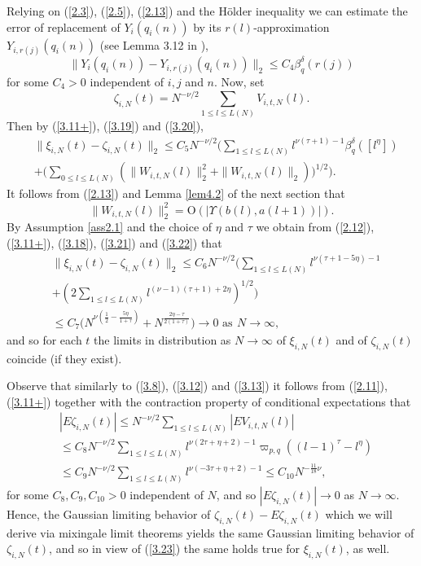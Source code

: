 Relying on (\ref{2.3}), (\ref{2.5}), (\ref{2.13}) and the H\" older inequality
 we can estimate the error of replacement of $Y_i(q_i(n))$ by its 
 $r(l)$-approximation $Y_{i,r(j)}(q_i(n))$ (see Lemma 3.12 in \cite{KV}),
 \begin{equation}\label{3.20}
 \| Y_i(q_i(n))-Y_{i,r(j)}(q_i(n))\|_2\leq C_4{{\beta}}_q^{{\delta}}(r(j))
 \end{equation}
 for some $C_4>0$ independent of $i,j$ and $n$. Now, set
 \[
 \zeta_{i,N}(t)=N^{-\nu/2}\sum_{1\leq l\leq L(N)}V_{i,t,N}(l).
 \]
 Then by (\ref{3.11+}), (\ref{3.19}) and (\ref{3.20}),
 \begin{eqnarray}\label{3.21}
 &\|\xi_{i,N}(t)-\zeta_{i,N}(t)\|_2\leq C_5N^{-\nu/2}\big(\sum_{1\leq l\leq
  L(N)}l^{\nu(\tau+1)-1}{{\beta}}^{{\delta}}_q([l^\eta])\\
  &+\big(\sum_{0\leq l\leq L(N)}(\| W_{i,t,N}(l)\|^2_2+
  \| W_{i,t,N}(l)\|_2)\big)^{1/2}\big).\nonumber
  \end{eqnarray}
  It follows from (\ref{2.13}) and Lemma \ref{lem4.2} of the next section that 
  \begin{equation}\label{3.22}
  \| W_{i,t,N}(l)\|^2_2=\mbox{O}(|{{\Upsilon}}(b(l),a(l+1))|).
  \end{equation}
  By Assumption \ref{ass2.1} and the choice of $\eta$ and $\tau$ 
  we obtain from (\ref{2.12}), (\ref{3.11+}), (\ref{3.18}), (\ref{3.21}) and
  (\ref{3.22}) that 
  \begin{eqnarray}\label{3.23}
  &\|\xi_{i,N}(t)-\zeta_{i,N}(t)\|_2\leq C_6N^{-\nu/2}\big(
  \sum_{1\leq l\leq L(N)}l^{\nu(\tau+1-5\eta)-1}\\
  &+(2\sum_{1\leq l\leq L(N)}l^{(\nu-1)(\tau+1)+2\eta})^{1/2}\big)
  \nonumber\\
  &\leq C_7\big(N^{\nu(\frac 12-\frac {5\eta}{1+\tau})}+N^{\frac {2\eta-\tau}
  {2(1+\tau)}}\big)\to 0\,\,\mbox{as}\,\ N\to\infty,\nonumber
  \end{eqnarray}
  and so for each $t$ the limits in distribution as 
  $N\to\infty$ of $\xi_{i,N}(t)$ and of $\zeta_{i,N}(t)$ coincide (if they 
  exist).
  
  Observe that similarly to (\ref{3.8}), (\ref{3.12}) and (\ref{3.13})
  it follows from (\ref{2.11}), (\ref{3.11+}) together with the contraction
  property of conditional expectations that
  \begin{eqnarray}\label{3.24}
  &|E\zeta_{i,N}(t)|\leq N^{-\nu/2}\sum_{1\leq l\leq L(N)}|EV_{i,t,N}(l)|\\
  &\leq C_8N^{-\nu/2}\sum_{1\leq l\leq L(N)}l^{\nu(2\tau+\eta+2)-1}
  {{\varpi}}_{p,q}((l-1)^\tau-l^\eta)\nonumber\\
  &\leq C_9N^{-\nu/2}\sum_{1\leq l\leq 
  L(N)}l^{\nu(-3\tau+\eta+2)-1}\leq C_{10}N^{-\frac {11}{18}\nu},\nonumber
  \end{eqnarray}
  for some $C_8,C_9,C_{10}>0$ independent of $N$, and so $|E\zeta_{i,N}(t)|
  \to 0$ as $N\to\infty$. Hence, the Gaussian limiting behavior of 
  $\zeta_{i,N}(t)-E\zeta_{i,N}(t)$ which we will derive via mixingale limit
  theorems yields the same Gaussian limiting behavior of $\zeta_{i,N}(t)$,
  and so in view of (\ref{3.23}) the same holds true for $\xi_{i,N}(t)$, as
  well.
  
